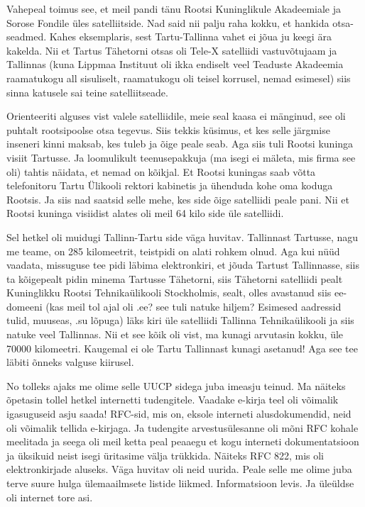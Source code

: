 
Vahepeal toimus see, et meil pandi tänu Rootsi Kuninglikule Akadeemiale ja Sorose Fondile üles satelliitside. Nad said nii palju raha kokku, et hankida otsa-seadmed. Kahes eksemplaris, sest Tartu-Tallinna vahet ei jõua ju keegi ära kakelda. Nii et Tartus Tähetorni otsas oli Tele-X satelliidi  vastuvõtujaam ja Tallinnas (kuna Lippmaa Instituut oli ikka endiselt veel Teaduste Akadeemia raamatukogu all sisuliselt, raamatukogu oli teisel korrusel, nemad esimesel) siis sinna katusele sai teine satelliitseade. 

Orienteeriti alguses vist valele satelliidile, meie seal kaasa ei mänginud, see oli puhtalt rootsipoolse otsa tegevus. Siis tekkis küsimus, et kes selle järgmise inseneri kinni maksab, kes tuleb ja õige peale seab. Aga siis tuli Rootsi kuninga visiit Tartusse. Ja loomulikult teenusepakkuja (ma isegi ei mäleta, mis firma see oli) tahtis näidata, et nemad on kõikjal. Et Rootsi kuningas saab võtta telefonitoru Tartu Ülikooli rektori kabinetis ja ühenduda kohe oma koduga Rootsis. Ja siis nad saatsid selle mehe, kes side õige satelliidi peale pani. Nii et Rootsi kuninga visiidist alates oli meil  64 kilo side üle satelliidi. 

Sel hetkel oli muidugi Tallinn-Tartu side väga huvitav. Tallinnast Tartusse, nagu me teame, on 285 kilomeetrit, teistpidi on alati rohkem olnud. Aga kui nüüd vaadata, missuguse tee pidi läbima elektronkiri, et jõuda Tartust Tallinnasse, siis ta kõigepealt pidin minema Tartusse Tähetorni, siis Tähetorni satelliidi pealt Kuninglikku Rootsi Tehnikaülikooli Stockholmis, sealt, olles avastanud siis ee-domeeni (kas meil tol ajal oli .ee? see tuli natuke hiljem? Esimesed aadressid tulid, muuseas, .su lõpuga) läks kiri üle satelliidi Tallinna Tehnikaülikooli ja siis natuke veel Tallinnas. Nii et see kõik oli vist, ma kunagi arvutasin kokku, üle 70000 kilomeetri. Kaugemal ei ole Tartu Tallinnast kunagi asetanud! Aga see tee läbiti õnneks valguse kiirusel. 


No tolleks ajaks me olime selle UUCP sidega juba  imeasju teinud. Ma näiteks õpetasin tollel hetkel internetti tudengitele. Vaadake e-kirja teel oli võimalik igasuguseid asju saada! RFC-sid, mis on, eksole interneti alusdokumendid, neid oli võimalik tellida e-kirjaga. Ja tudengite arvestusülesanne oli mõni RFC kohale meelitada ja seega oli meil ketta peal peaaegu et kogu interneti dokumentatsioon ja üksikuid neist isegi üritasime välja trükkida. Näiteks RFC 822, mis oli elektronkirjade aluseks. Väga huvitav oli neid uurida. Peale selle me olime juba terve suure hulga ülemaailmsete listide liikmed. Informatsioon levis. Ja üleüldse oli internet tore asi. 

